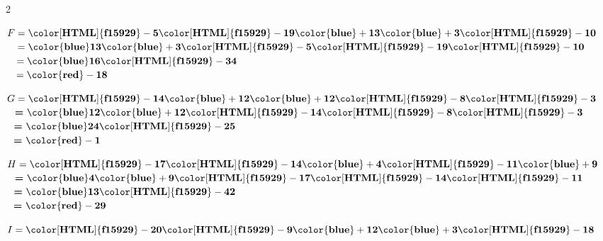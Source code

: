 \begin{corrige}
    \phantom{rrr}    
    \begin{multicols}2
        \begin{list}{}            
            \item $ F = \mathbf{{\color[HTML]{f15929}-5}}\mathbf{{\color[HTML]{f15929}-19}}\mathbf{{\color{blue}+13}}\mathbf{{\color{blue}+3}}\mathbf{{\color[HTML]{f15929}-10}}$\\
            $ \phantom{A } = \mathbf{{\color{blue}13}}\mathbf{{\color{blue}+3}}\mathbf{{\color[HTML]{f15929}-5}}\mathbf{{\color[HTML]{f15929}-19}}\mathbf{{\color[HTML]{f15929}-10}}$\\
            $ \phantom{A } = \mathbf{{\color{blue}16}}\mathbf{{\color[HTML]{f15929}-34}}$\\
            $ \phantom{A } = \mathbf{{\color{red}-18}} $
            \item $ G = \mathbf{{\color[HTML]{f15929}-14}}\mathbf{{\color{blue}+12}}\mathbf{{\color{blue}+12}}\mathbf{{\color[HTML]{f15929}-8}}\mathbf{{\color[HTML]{f15929}-3}}$\\
            $ \phantom{A }\textbf{=}~\mathbf{{\color{blue}12}}\mathbf{{\color{blue}+12}}\mathbf{{\color[HTML]{f15929}-14}}\mathbf{{\color[HTML]{f15929}-8}}\mathbf{{\color[HTML]{f15929}-3}}$\\
            $ \phantom{A }\textbf{=}~\mathbf{{\color{blue}24}}\mathbf{{\color[HTML]{f15929}-25}}$\\
            $ \phantom{A }\textbf{=}~\mathbf{{\color{red}-1}} $
            \columnbreak
            \item $ H = \mathbf{{\color[HTML]{f15929}-17}}\mathbf{{\color[HTML]{f15929}-14}}\mathbf{{\color{blue}+4}}\mathbf{{\color[HTML]{f15929}-11}}\mathbf{{\color{blue}+9}}$\\
            $ \phantom{A }\textbf{=}~\mathbf{{\color{blue}4}}\mathbf{{\color{blue}+9}}\mathbf{{\color[HTML]{f15929}-17}}\mathbf{{\color[HTML]{f15929}-14}}\mathbf{{\color[HTML]{f15929}-11}}$\\
            $ \phantom{A }\textbf{=}~\mathbf{{\color{blue}13}}\mathbf{{\color[HTML]{f15929}-42}}$\\
            $ \phantom{A }\textbf{=}~\mathbf{{\color{red}-29}} $
            \item $ I = \mathbf{{\color[HTML]{f15929}-20}}\mathbf{{\color[HTML]{f15929}-9}}\mathbf{{\color{blue}+12}}\mathbf{{\color{blue}+3}}\mathbf{{\color[HTML]{f15929}-18}}$\\

\end{list}
\end{multicols}
\end{corrige}
